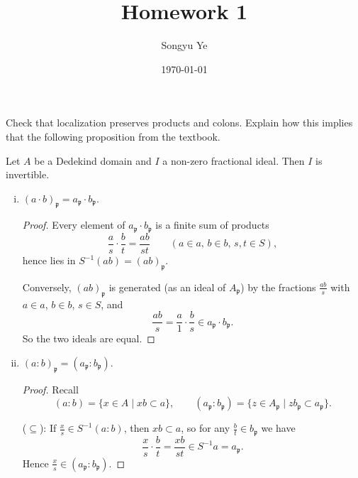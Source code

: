 \documentclass[12pt]{article}  %
\title{Homework 1}
\author{Songyu Ye}
\date{\today}
\begin{document}
\psettitle

\begin{problem}{1}
Check that localization preserves products and colons. Explain how this implies that the following proposition from the textbook. 
\begin{proposition}[S, Prop 1.3.5]
    Let $A$ be a Dedekind domain and $I$ a non-zero fractional ideal. Then $I$ is invertible.       
\end{proposition}
\end{problem}

\begin{solution}

\begin{enumerate}[(i)]
  \item $(a \cdot b)_{\mathfrak{p}} = a_{\mathfrak{p}} \cdot b_{\mathfrak{p}}$.

  \begin{proof}
  Every element of $a_{\mathfrak{p}} \cdot b_{\mathfrak{p}}$ is a finite sum of products
  \[
    \frac{a}{s} \cdot \frac{b}{t} = \frac{ab}{st} \qquad (a \in a,\, b \in b,\, s,t \in S),
  \]
  hence lies in $S^{-1}(ab) = (ab)_{\mathfrak{p}}$.

  Conversely, $(ab)_{\mathfrak{p}}$ is generated (as an ideal of $A_{\mathfrak{p}}$) 
  by the fractions $\tfrac{ab}{s}$ with $a \in a$, $b \in b$, $s \in S$, and
  \[
    \frac{ab}{s} = \frac{a}{1} \cdot \frac{b}{s} \in a_{\mathfrak{p}} \cdot b_{\mathfrak{p}}.
  \]
  So the two ideals are equal.
  \end{proof}

  \item $(a : b)_{\mathfrak{p}} = (a_{\mathfrak{p}} : b_{\mathfrak{p}})$.

  \begin{proof}
  Recall
  \[
    (a : b) = \{x \in A \mid x b \subset a \}, 
    \qquad
    (a_{\mathfrak{p}} : b_{\mathfrak{p}}) = \{ z \in A_{\mathfrak{p}} \mid z b_{\mathfrak{p}} \subset a_{\mathfrak{p}} \}.
  \]

  ($\subseteq$): If $\tfrac{x}{s} \in S^{-1}(a : b)$, then $x b \subset a$, so for any $\tfrac{b}{t} \in b_{\mathfrak{p}}$ we have
  \[
    \frac{x}{s} \cdot \frac{b}{t} = \frac{xb}{st} \in S^{-1} a = a_{\mathfrak{p}}.
  \]
  Hence $\tfrac{x}{s} \in (a_{\mathfrak{p}} : b_{\mathfrak{p}})$.


\end{proof}
\end{enumerate}
\end{solution}
\end{document}
